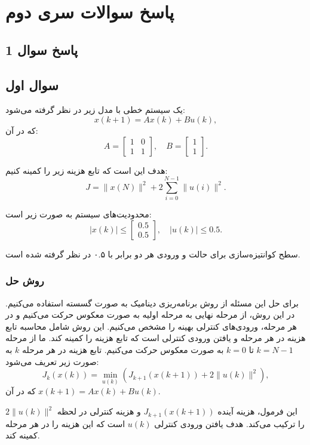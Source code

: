 
\chapter{پاسخ سوالات سری دوم}

\section{ پاسخ سوال 1}
\section{سوال اول}


یک سیستم خطی با مدل زیر در نظر گرفته می‌شود:  
\[
x(k+1) = A x(k) + B u(k),
\]
که در آن:
\[
A = \begin{bmatrix} 1 & 0 \\ 1 & 1 \end{bmatrix}, \quad B = \begin{bmatrix} 1 \\ 1 \end{bmatrix}.
\]

هدف این است که تابع هزینه زیر را کمینه کنیم:
\[
J = \|x(N)\|^2 + 2 \sum_{i=0}^{N-1} \|u(i)\|^2.
\]

محدودیت‌های سیستم به صورت زیر است:
\[
|x(k)| \leq \begin{bmatrix} 0.5 \\ 0.5 \end{bmatrix}, \quad |u(k)| \leq 0.5.
\]

سطح کوانتیزه‌سازی برای حالت و ورودی هر دو برابر با ۰.۵ در نظر گرفته شده است.

\subsection*{روش حل }
برای حل این مسئله از روش برنامه‌ریزی دینامیک به صورت گسسته استفاده می‌کنیم. در این روش، از مرحله نهایی به مرحله اولیه به صورت معکوس حرکت می‌کنیم و در هر مرحله، ورودی‌های کنترلی بهینه را مشخص می‌کنیم. این روش شامل محاسبه تابع هزینه در هر مرحله و یافتن ورودی کنترلی است که تابع هزینه را کمینه کند.  
ما از مرحله \( k = N-1 \) تا \( k = 0 \) به صورت معکوس حرکت می‌کنیم. تابع هزینه در هر مرحله \( k \) به صورت زیر تعریف می‌شود:
\[
J_k(x(k)) = \min_{u(k)} \left( J_{k+1}(x(k+1)) + 2\|u(k)\|^2 \right),
\]
که در آن \( x(k+1) = A x(k) + B u(k) \).

این فرمول، هزینه آینده \( J_{k+1}(x(k+1)) \) و هزینه کنترلی در لحظه \( 2\|u(k)\|^2 \) را ترکیب می‌کند. هدف یافتن ورودی کنترلی \( u(k) \) است که این هزینه را در هر مرحله کمینه کند.

